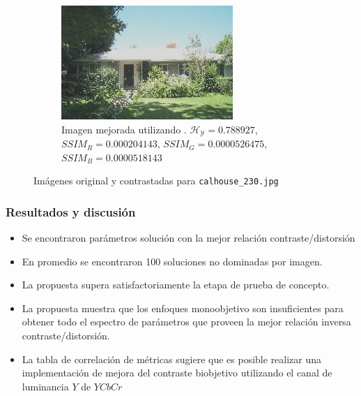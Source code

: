 \documentclass[usenames,dvipsnames]{beamer}
\begin{document}
\begin{frame}
\begin{figure}[H]
\begin{subfigure}[t]{0.45\textwidth}
    \includegraphics[width=\textwidth]{graphics/calhouse_0230_20-20-0020072469292179818.jpg}
    \caption{Imagen mejorada utilizando \cite{morepso}. $\mathscr{H_Y}=0.788927$, $SSIM_R=0.000204143$, $SSIM_G=0.0000526475$, $SSIM_B=0.0000518143$}
    \label{fig:casa1enhanced3}
    \end{subfigure}

    \caption{Imágenes original y contrastadas para \texttt{calhouse\_230.jpg}}\label{fig:casa1}
    \end{figure}

    \end{frame}

    \begin{frame}
    \frametitle{Resultados y discusión} 
\begin{exampleblock}{}

\begin{itemize}
	\item Se encontraron parámetros solución con la mejor relación contraste/distorsión
	\item En promedio se encontraron 100 soluciones no dominadas por imagen.
	\item La propuesta supera satisfactoriamente la etapa de prueba de concepto.
	\item La propuesta muestra que los enfoques monoobjetivo son insuficientes para obtener todo el espectro de parámetros que proveen la mejor relación inversa contraste/distorsión.
	\item La tabla de correlación de métricas sugiere que es posible realizar una implementación de mejora del contraste biobjetivo utilizando el canal de luminancia $Y$ de $YCbCr$
\end{itemize}

\end{exampleblock}

\end{frame}
\end{document}
